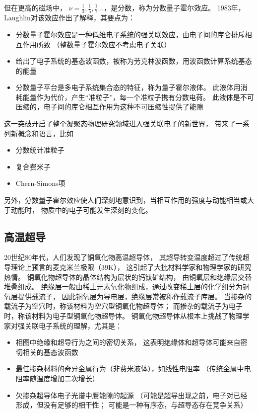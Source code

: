 \documentclass{article}
\begin{document}
但在更高的磁场中，
$\nu=\frac{1}{3},\frac{1}{5},\frac{1}{7}\dots$，是分数，称为分数量子霍尔效应。
1983年，Laughlin对该效应作出了解释，其要点为：
\begin{itemize}
    \item 分数量子霍尔效应是一种低维电子系统的强关联效应，由电子间的库仑排斥相互作用所致
     （整数量子霍尔效应不考虑电子关联）
    \item 给出了电子系统的基态波函数，被称为劳克林波函数，用波函数计算系统基态的能量
    \item 分数量子平台是多电子系统集合态的特征，称为量子霍尔液体。
    此液体用消耗能量作为代价，产生“准粒子”，每一个准粒子携有分数电荷。
    此液体是不可压缩的，电子间的库仑相互作用为这种不可压缩性提供了能隙
\end{itemize}
这一突破开启了整个凝聚态物理研究领域进入强关联电子的新世界，
带来了一系列新概念和语言，比如
\begin{itemize}
    \item 分数统计准粒子
    \item 复合费米子
    \item Chern-Simons项
\end{itemize}
另外，分数量子霍尔效应使人们深刻地意识到，当相互作用的强度与动能相当或大于动能时，
物质中的电子可能发生深刻的变化。

\subsection{高温超导}
20世纪80年代，人们发现了铜氧化物高温超导体，
其超导转变温度超过了传统超导理论上预言的麦克米兰极限（39K），
这引起了大批材料学家和物理学家的研究热情。
铜氧化物超导体的晶体结构为层状的钙钛矿结构，
由铜氧层和绝缘层交替堆叠组成。
绝缘层一般由稀土元素氧化物组成，通过改变稀土层的化学组分为铜氧层提供载流子，
因此铜氧层为导电层，绝缘层常被称作载流子库层。
当掺杂的载流子为空穴时，称该材料为空穴型铜氧化物超导体；
而掺杂的载流子为电子时，称该材料为电子型铜氧化物超导体。
铜氧化物超导体从根本上挑战了物理学家对强关联电子系统的理解，尤其是：
\begin{itemize}
    \item 相图中绝缘和超导行为之间的密切关系，
    这表明绝缘体和超导体可能来自密切相关的基态波函数
    \item 最佳掺杂材料的奇异金属行为（非费米液体），如线性电阻率
    （传统金属中电阻率随温度增加二次增长）
    \item 欠掺杂超导体电子光谱中赝能隙的起源
    （可能是超导出现之前，电子对已经形成，但没有足够的相干性；
    可能是一种有序态，与超导态存在竞争关系）
 \end{itemize}
\end{document}
